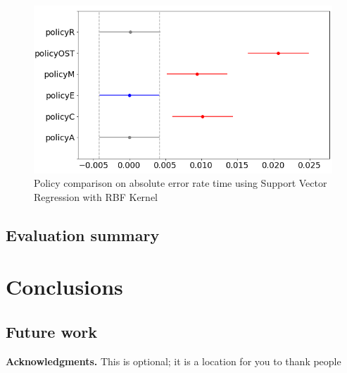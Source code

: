 \documentclass{mpaper}
\begin{document}
\begin{figure}[h]
    \centering
    \includegraphics[scale=0.35]{imgs/svr_rbf_R5_error_plot_diff_means.png}
    \caption{Policy comparison on absolute error rate time using Support Vector Regression with RBF Kernel}
    \label{fig:svr_rbf_R5_waiting_plot_diff_means}
\end{figure}

\subsection{Evaluation summary}

\section{Conclusions}

\subsection*{Future work}

{\bf Acknowledgments.}
This is optional; it is a location for you to thank people




\pagebreak
\end{document}
